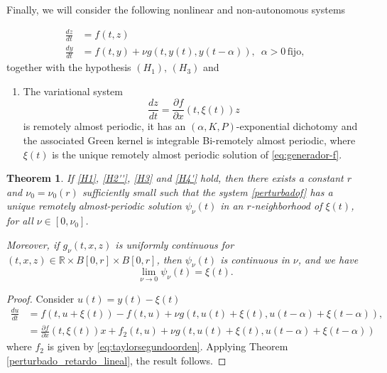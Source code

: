 \documentclass[english,reqno]{amsart}
\numberwithin{equation}{section}
\theoremstyle{plain}
\newtheorem{thm}{Theorem}[section]
\theoremstyle{definition}
\theoremstyle{remark}
\begin{document}
Finally, we will consider the following nonlinear and non-autonomous systems

\begin{align}
\frac{dz}{dt} & =f\left(t,z\right)\label{eq:generador-f}\\
\frac{dy}{dt} & =f\left(t,y\right)+\nu g\left(t,y\left(t\right),y\left(t-\alpha\right)\right),\,\,\,\alpha>0\,\mbox{fijo},\label{perturbadof}
\end{align}
together with the hypothesis $\left(H_{1}\right),\,\left(H_{3}\right)$ and 
\begin{enumerate}[label=(\textbf{H.2''})]
\item\label{H2''} The variational system
\begin{equation}
\frac{dz}{dt}=\frac{\partial f}{\partial x}\left(t,\xi\left(t\right)\right)z\label{eq:varicional}
\end{equation}
is remotely almost periodic, it has an $(\alpha,K,P)$-exponential dichotomy and the associated Green kernel is integrable Bi-remotely almost periodic, where $\xi\left(t\right)$ is the unique remotely almost periodic solution of \eqref{eq:generador-f}.
\end{enumerate}

\begin{thm}
If \ref{H1}, \ref{H2''}, \ref{H3} and \ref{H4'} hold, 
then there exists a constant $r$ and $\nu_{0}=\nu_{0}\left(r\right)$ sufficiently small such that the system \eqref{perturbadof} has a unique remotely almost-periodic solution $\psi_{\nu}\left(t\right)$ in an $r$-neighborhood of $\xi\left(t\right)$, for all $\nu\in\left[0,\nu_{0}\right]$.  

Moreover, if $g_{\nu}\left(t,x,z\right)$ is uniformly continuous for $\left(t,x,z\right)\in\mathbb{R}\times B\left[0,r\right]\times B\left[0,r\right]$, then $\psi_{\nu}\left(t\right)$ is continuous in $\nu$, and we have  
\[
\lim_{\nu\rightarrow0}\psi_{\nu}\left(t\right)=\xi(t).
\]
\end{thm}
\begin{proof}
Consider $u\left(t\right)=y\left(t\right)-\xi\left(t\right)$
\begin{align*}
\frac{du}{dt} & =f\left(t,u+\xi\left(t\right)\right)-f\left(t,u\right)+\nu g\left(t,u\left(t\right)+\xi\left(t\right),u\left(t-\alpha\right)+\xi\left(t-\alpha\right)\right),\\
 & =\frac{\partial f}{\partial x}\left(t,\xi\left(t\right)\right)x+f_{2}\left(t,u\right)+\nu g\left(t,u\left(t\right)+\xi\left(t\right),u\left(t-\alpha\right)+\xi\left(t-\alpha\right)\right)
\end{align*}
where $f_2$ is given by \eqref{eq:taylorsegundoorden}.
Applying Theorem \ref{perturbado_retardo_lineal}, the result follows.
\end{proof}
\end{document}
